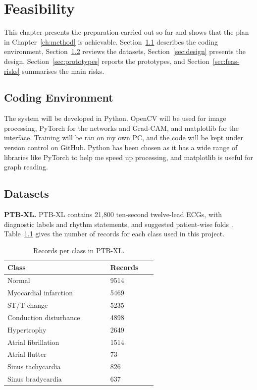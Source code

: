 \chapter{Feasibility}
\label{ch:feasibility}

This chapter presents the preparation carried out so far and shows that the plan in
Chapter~\ref{ch:method} is achievable. Section~\ref{sec:env} describes the coding
environment, Section~\ref{sec:datasets} reviews the datasets, Section~\ref{sec:design}
presents the design, Section~\ref{sec:prototypes} reports the prototypes, and
Section~\ref{sec:feas-risks} summarises the main risks.

\section{Coding Environment}
\label{sec:env}

The system will be developed in Python. OpenCV \cite{bradski_opencv_2000} will be used for image
processing, PyTorch for the networks and Grad-CAM, and
matplotlib 
for the interface. Training will be ran on my own PC, and the code will be
kept under version control on GitHub. Python has been chosen as it has a wide range of libraries like PyTorch to help me speed up processing, and matplotlib is useful for graph reading.

\section{Datasets}
\label{sec:datasets}

\textbf{PTB-XL.} PTB-XL contains 21,800 ten-second twelve-lead ECGs, with diagnostic
labels and rhythm statements, and suggested patient-wise folds
\cite{wagner_ptbxl_2020}. Table~\ref{tab:class-counts} gives the number of records for each
class used in this project.

\begin{table}[ht]
  \centering
  \footnotesize
  \caption{Records per class in PTB-XL.}
  \label{tab:class-counts}
  \begin{tabular}{@{}p{0.45\linewidth} p{0.15\linewidth}@{}}
    \toprule
    \textbf{Class} & \textbf{Records} \\
    \midrule
    Normal & 9514 \\
    Myocardial infarction & 5469 \\
    ST/T change & 5235 \\
    Conduction disturbance & 4898 \\
    Hypertrophy & 2649 \\
    Atrial fibrillation & 1514 \\
    Atrial flutter & 73 \\
    Sinus tachycardia & 826 \\
    Sinus bradycardia & 637 \\
    \bottomrule
  \end{tabular}
\end{table}

